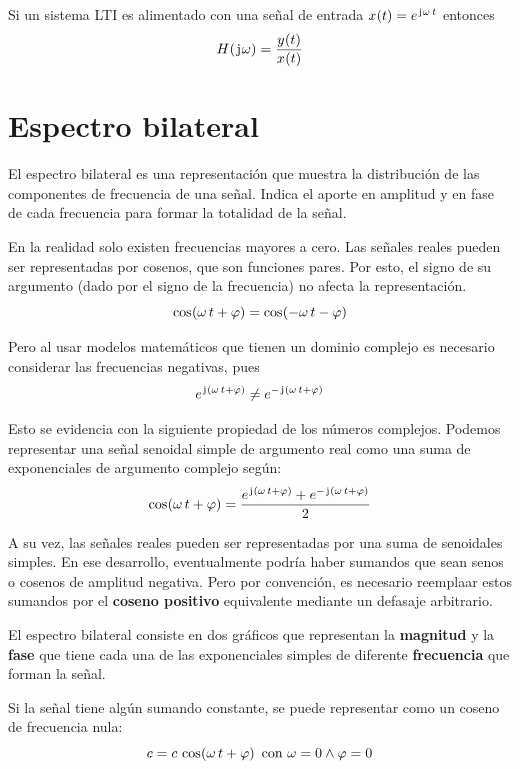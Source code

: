\begin{mdframed}[style=PropertyFrame]
    \begin{prop}
        \label{prop:funcionDeTransferencia}
    \end{prop}
    Si un sistema LTI es alimentado con una señal de entrada $\fx[x]{t} = e^{\iu \omega \, t}$ entonces
    \[
        \fx[H]{\iu \omega} = \frac{\fx[y]{t}}{\fx[x]{t}}
    \]
\end{mdframed}

\section{Espectro bilateral}

El espectro bilateral es una representación que muestra la distribución de las componentes de frecuencia de una señal.
Indica el aporte en amplitud y en fase de cada frecuencia para formar la totalidad de la señal.

En la realidad solo existen frecuencias mayores a cero.
Las señales reales pueden ser representadas por cosenos, que son funciones pares.
Por esto, el signo de su argumento (dado por el signo de la frecuencia) no afecta la representación.
\[
    \fx[\cos]{\omega \, t + \varphi} = \fx[\cos]{- \omega \, t - \varphi}
\]

Pero al usar modelos matemáticos que tienen un dominio complejo es necesario considerar las frecuencias negativas, pues
\[
    e^{\iu (\omega \, t + \varphi)} \neq e^{- \iu (\omega \, t + \varphi)}
\]

Esto se evidencia con la siguiente propiedad de los números complejos.
Podemos representar una señal senoidal simple de argumento real como una suma de exponenciales de argumento complejo según:
\[
    \fx[\cos]{\omega \, t + \varphi} = \frac{e^{\iu (\omega \, t + \varphi)} + e^{- \iu (\omega \, t + \varphi)}}{2}
\]

A su vez, las señales reales pueden ser representadas por una suma de senoidales simples.
En ese desarrollo, eventualmente podría haber sumandos que sean senos o cosenos de amplitud negativa.
Pero por convención, es necesario reemplaar estos sumandos por el \textbf{coseno positivo} equivalente mediante un defasaje arbitrario.

El espectro bilateral consiste en dos gráficos que representan la \textbf{magnitud} y la \textbf{fase} que tiene cada una de las exponenciales simples de diferente \textbf{frecuencia} que forman la señal.

Si la señal tiene algún sumando constante, se puede representar como un coseno de frecuencia nula:
\[
    c = c \, \fx[\cos]{\omega \, t + \varphi} \text{ con } \omega = 0 \land \varphi = 0
\]

